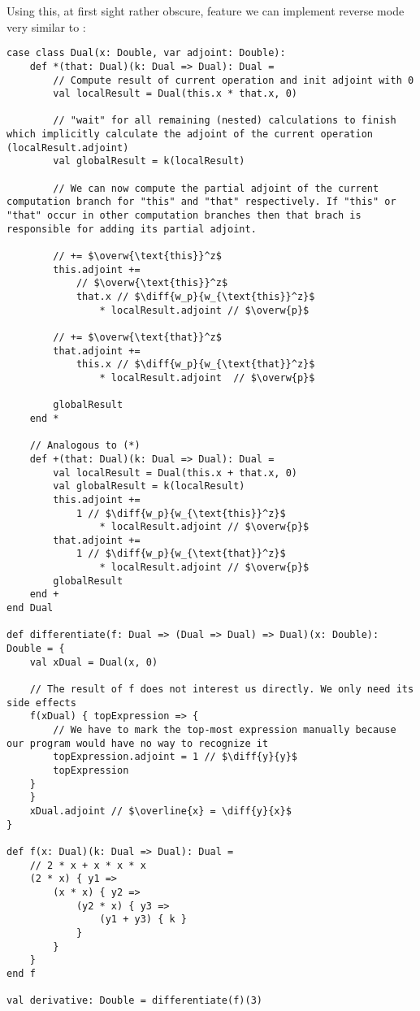 Using this, at first sight rather obscure, feature we can implement reverse mode very similar to :
\begin{lstlisting}[mathescape=true]
case class Dual(x: Double, var adjoint: Double):
    def *(that: Dual)(k: Dual => Dual): Dual =
        // Compute result of current operation and init adjoint with 0
        val localResult = Dual(this.x * that.x, 0) 

        // "wait" for all remaining (nested) calculations to finish which implicitly calculate the adjoint of the current operation (localResult.adjoint)
        val globalResult = k(localResult)

        // We can now compute the partial adjoint of the current computation branch for "this" and "that" respectively. If "this" or "that" occur in other computation branches then that brach is responsible for adding its partial adjoint.

        // += $\overw{\text{this}}^z$
        this.adjoint +=
            // $\overw{\text{this}}^z$
            that.x // $\diff{w_p}{w_{\text{this}}^z}$
                * localResult.adjoint // $\overw{p}$

        // += $\overw{\text{that}}^z$
        that.adjoint +=
            this.x // $\diff{w_p}{w_{\text{that}}^z}$
                * localResult.adjoint  // $\overw{p}$

        globalResult
    end *

    // Analogous to (*)
    def +(that: Dual)(k: Dual => Dual): Dual =
        val localResult = Dual(this.x + that.x, 0)
        val globalResult = k(localResult)
        this.adjoint +=
            1 // $\diff{w_p}{w_{\text{this}}^z}$
                * localResult.adjoint // $\overw{p}$
        that.adjoint +=
            1 // $\diff{w_p}{w_{\text{that}}^z}$
                * localResult.adjoint // $\overw{p}$
        globalResult
    end +
end Dual

def differentiate(f: Dual => (Dual => Dual) => Dual)(x: Double): Double = {
    val xDual = Dual(x, 0)

    // The result of f does not interest us directly. We only need its side effects
    f(xDual) { topExpression => {
        // We have to mark the top-most expression manually because our program would have no way to recognize it
        topExpression.adjoint = 1 // $\diff{y}{y}$
        topExpression
    }
    }
    xDual.adjoint // $\overline{x} = \diff{y}{x}$
}

def f(x: Dual)(k: Dual => Dual): Dual =
    // 2 * x + x * x * x
    (2 * x) { y1 =>
        (x * x) { y2 =>
            (y2 * x) { y3 =>
                (y1 + y3) { k }
            }
        }
    }
end f

val derivative: Double = differentiate(f)(3)

\end{lstlisting}

